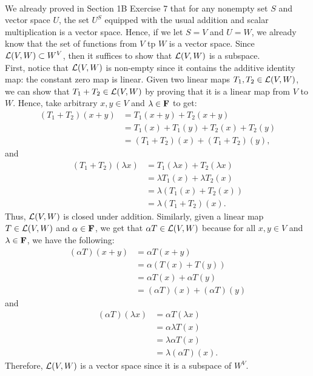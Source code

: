 \begin{solution}
    \\ We already proved in Section 1B Exercise 7 that for any nonempty set $S$ and vector space $U$, the set $U^S$ equipped with the usual addition and scalar multiplication is a vector space. Hence, if we let $S = V$ and $U = W$, we already know that the set of functions from $V$ tp $W$ is a vector space. Since $\mathcal{L}(V, W) \subset W^V$, then it suffices to show that $\mathcal{L}(V, W)$ is a subspace. \\
    First, notice that $\mathcal{L}(V, W)$ is non-empty since it contains the additive identity map: the constant zero map is linear. Given two linear maps $T_1, T_2 \in \mathcal{L}(V, W)$, we can show that $T_1 + T_2 \in \mathcal{L}(V, W)$ by proving that it is a linear map from $V$ to $W$. Hence, take arbitrary $x,y \in V$ and $\lambda \in \mathbf{F}$ to get:
    \begin{align*}
        (T_1 + T_2)(x + y) &= T_1(x + y) + T_2(x + y) \\
        &= T_1(x) + T_1(y) + T_2(x) + T_2(y) \\
        &= (T_1 + T_2)(x) + (T_1 + T_2)(y),
    \end{align*}
    and
    \begin{align*}
        (T_1 + T_2)(\lambda x) &= T_1(\lambda x) + T_2(\lambda x) \\
        &= \lambda T_1(x) + \lambda T_2(x) \\
        &= \lambda (T_1(x) + T_2(x)) \\
        &= \lambda (T_1 + T_2)(x).
    \end{align*}
    Thus, $\mathcal{L}(V, W)$ is closed under addition. Similarly, given a linear map $T \in \mathcal{L}(V, W)$ and $\alpha \in \mathbf{F}$, we get that $\alpha T \in \mathcal{L}(V, W)$ because for all $x,y \in V$ and $\lambda \in \mathbf{F}$, we have the following:
    \begin{align*}
        (\alpha T)(x + y) &= \alpha T(x + y) \\
        &= \alpha (T(x) + T(y)) \\
        &= \alpha T(x) + \alpha T(y) \\
        &= (\alpha T)(x) + (\alpha T)(y)
    \end{align*}
    and
    \begin{align*}
        (\alpha T)(\lambda x) &= \alpha T(\lambda x) \\
        &= \alpha \lambda T(x) \\
        &= \lambda \alpha T(x) \\
        &= \lambda (\alpha T)(x).
    \end{align*}
    Therefore, $\mathcal{L}(V, W)$ is a vector space since it is a subspace of $W^V$. \\
\end{solution}

